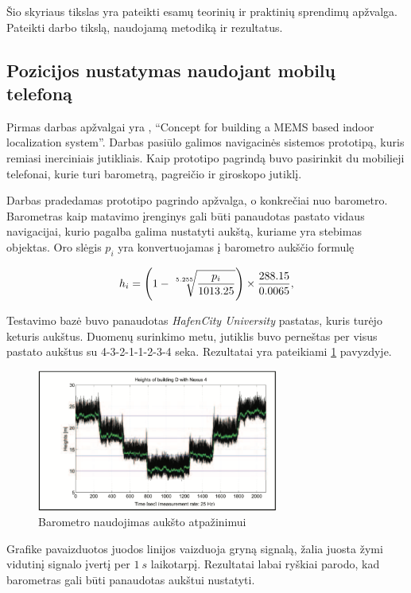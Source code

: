 Šio skyriaus tikslas yra pateikti esamų teorinių ir praktinių sprendimų apžvalga. Pateikti darbo tikslą, naudojamą metodiką ir rezultatus.

\subsection{Pozicijos nustatymas naudojant mobilų telefoną}

Pirmas darbas apžvalgai yra \cite{willemsenconcept}, ``Concept for building a MEMS based indoor localization system''. Darbas pasiūlo galimos navigacinės sistemos prototipą, kuris remiasi inerciniais jutikliais. Kaip prototipo pagrindą buvo pasirinkit du mobilieji telefonai, kurie turi barometrą, pagreičio ir giroskopo jutiklį.

Darbas pradedamas prototipo pagrindo apžvalga, o konkrečiai nuo barometro. Barometras kaip matavimo įrenginys gali būti panaudotas pastato vidaus navigacijai, kurio pagalba galima nustatyti aukštą, kuriame yra stebimas objektas. Oro slėgis $p_i$ yra konvertuojamas į barometro aukščio formulę

\begin{equation}
    h_i = \Bigg( 1 - \sqrt[\leftroot{-2}\uproot{2}5.255]{ \frac{p_i}{1013.25} } \Bigg) \times \frac{288.15}{0.0065},
\end{equation}

Testavimo bazė buvo panaudotas \textit{HafenCity University} pastatas, kuris turėjo keturis aukštus. Duomenų surinkimo metu, jutiklis buvo perneštas per visus pastato aukštus su 4-3-2-1-1-2-3-4 seka. Rezultatai yra pateikiami \ref{fig:floor_detection_with_barometer_data} pavyzdyje.

\begin{figure}[H]
    \centering
    \includegraphics[width=300px]{img/floor_detection_with_barometer_data.png}
    \caption{Barometro naudojimas aukšto atpažinimui \cite{willemsenconcept}}
    \label{fig:floor_detection_with_barometer_data}
\end{figure}

Grafike pavaizduotos juodos linijos vaizduoja gryną signalą, žalia juosta žymi vidutinį signalo įvertį per $1~s$ laikotarpį. Rezultatai labai ryškiai parodo, kad barometras gali būti panaudotas aukštui nustatyti.

